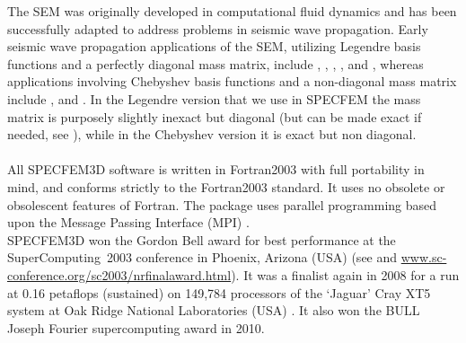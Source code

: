 The SEM was originally developed in computational fluid dynamics \citep{Pat84,MaPa89}
and has been successfully adapted to address problems in seismic wave
propagation. Early seismic wave propagation applications of the SEM,
utilizing Legendre basis functions and a perfectly diagonal mass matrix,
include \citet{CoJoTo93}, \citet{Kom97}, \citet{FaMaPaQu97}, \citet{CaGa97},
\citet{KoVi98} and \citet{KoTr99}, whereas applications involving
Chebyshev basis functions and a non-diagonal mass matrix include \citet{SePr94},
\citet{PrCaSe94} and \citet{SePrPr95}.
In the Legendre version that we use in SPECFEM the mass matrix is purposely slightly inexact but diagonal (but can be made exact if needed, see \cite{Teu15}),
while in the Chebyshev version it is exact but non diagonal.\\


\\


All SPECFEM3D software is written in Fortran2003 with full portability
in mind, and conforms strictly to the Fortran2003 standard. It uses
no obsolete or obsolescent features of Fortran. The package uses parallel
programming based upon the Message Passing Interface (MPI) \citep{GrLuSk94,Pac97}.\\


SPECFEM3D won the Gordon Bell award for best performance at the SuperComputing~2003
conference in Phoenix, Arizona (USA) (see \citet{KoTsChTr03} and
\url{www.sc-conference.org/sc2003/nrfinalaward.html}). It was a finalist
again in 2008 for a run at 0.16 petaflops (sustained) on 149,784 processors
of the `Jaguar' Cray XT5 system at Oak Ridge National Laboratories
(USA) \citep{CaKoLaTiMiLeSnTr08}. It also won the BULL Joseph Fourier
supercomputing award in 2010.\\

